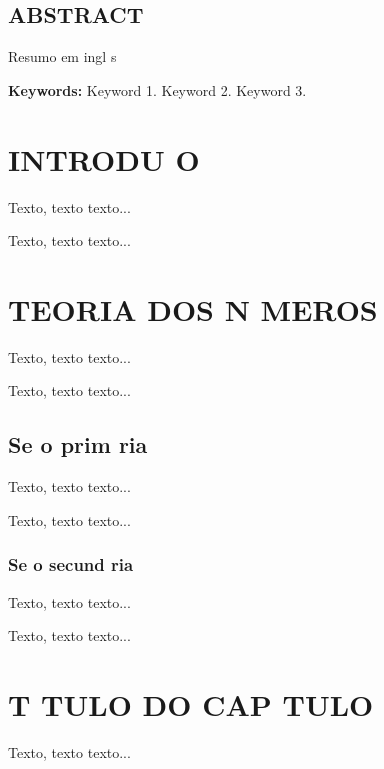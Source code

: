 \documentclass{article}
\begin{document}
\section*{\normalsize \centering \textbf{ABSTRACT}}

\noindent Resumo em ingl s

\vspace*{0.5cm}

\noindent\textbf{Keywords:} Keyword 1. Keyword 2. Keyword 3.
\newpage





\chapter{INTRODU O}
\thispagestyle{myheadings}

Texto, texto texto...

Texto, texto texto...


\chapter{TEORIA DOS N MEROS}
\thispagestyle{myheadings}

Texto, texto texto...

Texto, texto texto...

\section{Se o prim ria}

Texto, texto texto...

Texto, texto texto...

\subsection{Se o secund ria}

Texto, texto texto...

Texto, texto texto...


\chapter{T TULO DO CAP TULO}
\thispagestyle{myheadings}

Texto, texto texto...
\end{document}
